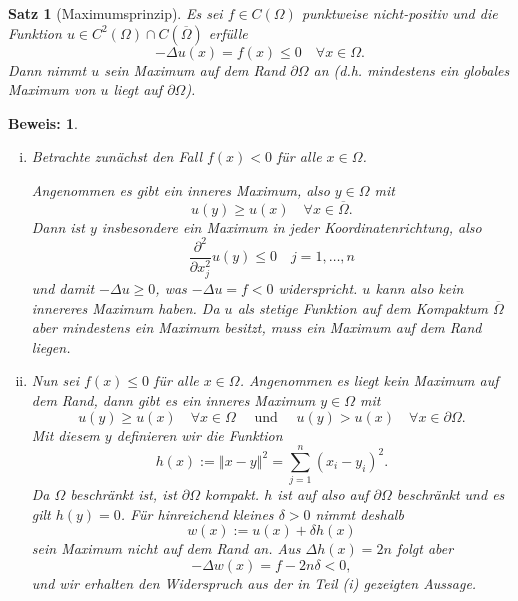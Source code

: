 \documentclass[12pt,a4paper]{book}
\theoremstyle{break}
\newtheorem{theorem}{Satz}[chapter]
\theoremstyle{nonumberplain}
\newtheorem{beweis}{Beweis:}
\newcommand{\norm}[1]{\left\Vert#1\right\Vert}		%
\newcommand{\1}{\mathbbm{1}} 			      	%
\newcommand{\labeq}[1]{\label{eq:#1}}			%
\begin{document}
\begin{theorem}[Maximumsprinzip]\label{satz:maxprinzip}
Es sei $f\in C(\Omega)$ punktweise nicht-positiv und die Funktion $u\in C^2(\Omega)\cap C(\overline \Omega)$ erfülle
\begin{equation}\labeq{laplace}
-\Delta u(x)=f(x)\leq 0 \quad \forall x\in \Omega.
\end{equation}
Dann nimmt $u$ sein Maximum auf dem Rand $\partial \Omega$ an (d.h. mindestens ein globales Maximum von $u$ liegt auf  $\partial \Omega$).
\end{theorem}
\begin{beweis}
\begin{enumerate}[(i)]
\item Betrachte zunächst den Fall $f(x)<0$ für alle $x\in \Omega$. 

Angenommen es gibt ein inneres Maximum, also $y\in \Omega$ mit
\[
u(y)\geq u(x) \quad \forall x\in \overline{\Omega}.
\]
Dann ist $y$ insbesondere ein Maximum in jeder Koordinatenrichtung, also
\[
\frac{\partial^2}{\partial x_j^2} u(y)\leq 0 \quad j=1,\ldots,n
\]
und damit $-\Delta u\geq 0$, was $-\Delta u=f<0$ widerspricht. $u$ kann also kein 
innereres Maximum haben. Da $u$ als stetige Funktion auf dem Kompaktum $\overline \Omega$ aber mindestens ein Maximum besitzt, muss ein Maximum auf dem Rand liegen.
%
\item Nun sei $f(x)\leq 0$ für alle $x\in \Omega$. 
Angenommen es liegt kein Maximum auf dem Rand, dann gibt es ein inneres Maximum $y\in \Omega$ mit
\[
u(y)\geq u(x) \quad \forall x\in \Omega\quad \mbox{ und } \quad
u(y)> u(x) \quad \forall x\in \partial \Omega.
\]
Mit diesem $y$ definieren wir die Funktion
\[
h(x):=\norm{x-y}^2=\sum_{j=1}^n (x_i-y_i)^2.
\]
Da $\Omega$ beschränkt ist, ist $\partial \Omega$ kompakt. 
$h$ ist auf also auf $\partial \Omega$ beschränkt und es gilt $h(y)=0$. Für hinreichend kleines $\delta>0$ nimmt deshalb 
\[
w(x):=u(x)+\delta h(x)
\]
sein Maximum nicht auf dem Rand an. Aus $\Delta h(x)=2n$ folgt aber
\[
-\Delta w(x)=f-2n\delta<0,
\]
und wir erhalten den Widerspruch aus der in Teil (i) gezeigten Aussage.
\end{enumerate}
\end{beweis}
\end{document}
